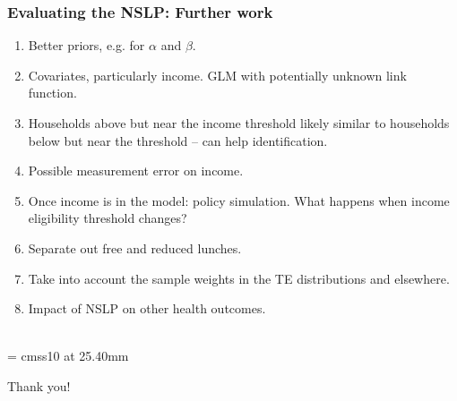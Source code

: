 \documentclass[xcolor=dvipsnames]{beamer}
\begin{document}
\begin{frame}[fragile]
\frametitle{Evaluating the NSLP: Further work}
  \begin{enumerate}
\item Better priors, e.g. for $\alpha$ and $\beta$.
\item Covariates, particularly income. GLM with potentially unknown link function.
\item Households above but near the income threshold likely similar to households below but near the threshold -- can help identification.
\item Possible measurement error on income.
\item Once income is in the model: policy simulation. What happens when income eligibility threshold changes?
\item Separate out free and reduced lunches.
\item Take into account the sample weights in the TE distributions and elsewhere.
\item Impact of NSLP on other health outcomes.\\~\\
  \end{enumerate}
  
\end{frame}


\appendix
{}
\setcounter{finalframe}{\value{framenumber}}

\begin{frame}

      \begin{center}

        \font\endfont = cmss10 at 25.40mm
        \color{Red}
        \endfont 
        \baselineskip 20.0mm

        Thank you!

      \end{center}    


\end{frame}
\end{document}
